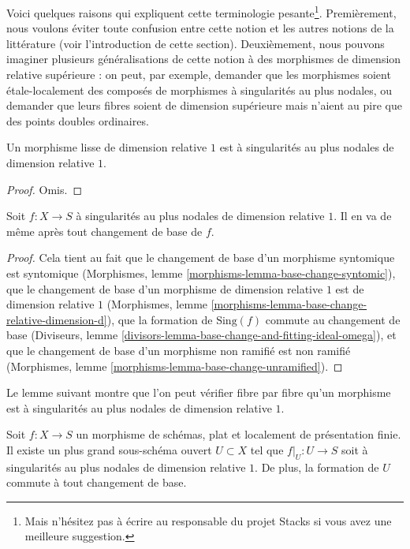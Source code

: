 \noindent
Voici quelques raisons qui expliquent cette terminologie pesante\footnote{Mais n'hésitez pas à écrire au responsable du projet Stacks si vous avez une meilleure suggestion.}. Premièrement, nous voulons éviter toute confusion entre cette notion et les autres notions de la littérature (voir l'introduction de cette section). Deuxièmement, nous pouvons imaginer plusieurs généralisations de cette notion à des morphismes de dimension relative supérieure : on peut, par exemple, demander que les morphismes soient étale-localement des composés de morphismes à singularités au plus nodales, ou demander que leurs fibres soient de dimension supérieure mais n'aient au pire que des points doubles ordinaires.

\begin{lemma}
\label{lemma-smooth-relative-dimension-1}
Un morphisme lisse de dimension relative $1$ est à singularités au plus nodales de dimension relative $1$.
\end{lemma}

\begin{proof}
Omis.
\end{proof}

\begin{lemma}
\label{lemma-base-change-nodal-family}
Soit $f : X \to S$ à singularités au plus nodales de dimension relative $1$. Il en va de même après tout changement de base de $f$.
\end{lemma}

\begin{proof}
Cela tient au fait que le changement de base d'un morphisme syntomique est syntomique (Morphismes, lemme \ref{morphisms-lemma-base-change-syntomic}), que le changement de base d'un morphisme de dimension relative $1$ est de dimension relative $1$ (Morphismes, lemme \ref{morphisms-lemma-base-change-relative-dimension-d}), que la formation de $\text{Sing}(f)$ commute au changement de base (Diviseurs, lemme \ref{divisors-lemma-base-change-and-fitting-ideal-omega}), et que le changement de base d'un morphisme non ramifié est non ramifié (Morphismes, lemme \ref{morphisms-lemma-base-change-unramified}).
\end{proof}

\noindent
Le lemme suivant montre que l'on peut vérifier fibre par fibre qu'un morphisme est à singularités au plus nodales de dimension relative $1$.

\begin{lemma}
\label{lemma-locus-where-nodal}
Soit $f : X \to S$ un morphisme de schémas, plat et localement de présentation finie. Il existe un plus grand sous-schéma ouvert $U \subset X$ tel que $f|_U : U \to S$ soit à singularités au plus nodales de dimension relative $1$. De plus, la formation de $U$ commute à tout changement de base.
\end{lemma}

